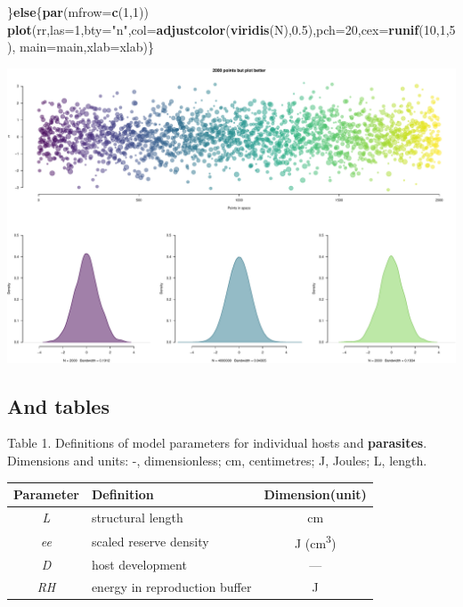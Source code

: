 \documentclass[10,portrait]{article}
\newenvironment{Shaded}{\begin{snugshade}}{\end{snugshade}}
\newcommand{\KeywordTok}[1]{\textcolor[rgb]{0.13,0.29,0.53}{\textbf{#1}}}
\newcommand{\DataTypeTok}[1]{\textcolor[rgb]{0.13,0.29,0.53}{#1}}
\newcommand{\DecValTok}[1]{\textcolor[rgb]{0.00,0.00,0.81}{#1}}
\newcommand{\FloatTok}[1]{\textcolor[rgb]{0.00,0.00,0.81}{#1}}
\newcommand{\StringTok}[1]{\textcolor[rgb]{0.31,0.60,0.02}{#1}}
\newcommand{\ControlFlowTok}[1]{\textcolor[rgb]{0.13,0.29,0.53}{\textbf{#1}}}
\newcommand{\NormalTok}[1]{#1}
\begin{document}
\begin{Shaded}
\begin{Highlighting}[]
\NormalTok{\}}\ControlFlowTok{else}\NormalTok{\{}\KeywordTok{par}\NormalTok{(}\DataTypeTok{mfrow=}\KeywordTok{c}\NormalTok{(}\DecValTok{1}\NormalTok{,}\DecValTok{1}\NormalTok{))}
  \KeywordTok{plot}\NormalTok{(rr,}\DataTypeTok{las=}\DecValTok{1}\NormalTok{,}\DataTypeTok{bty=}\StringTok{"n"}\NormalTok{,}\DataTypeTok{col=}\KeywordTok{adjustcolor}\NormalTok{(}\KeywordTok{viridis}\NormalTok{(N),}\FloatTok{0.5}\NormalTok{),}\DataTypeTok{pch=}\DecValTok{20}\NormalTok{,}\DataTypeTok{cex=}\KeywordTok{runif}\NormalTok{(}\DecValTok{10}\NormalTok{,}\DecValTok{1}\NormalTok{,}\DecValTok{5}\NormalTok{),}
       \DataTypeTok{main=}\NormalTok{main,}\DataTypeTok{xlab=}\NormalTok{xlab)\}}
\end{Highlighting}
\end{Shaded}

\includegraphics{R_is_dope_files/figure-latex/unnamed-chunk-4-1.pdf}

\newpage  

\subsection{And tables}\label{and-tables}

Table 1. Definitions of model parameters for individual hosts and
\textbf{parasites}. Dimensions and units: -, dimensionless; cm,
centimetres; J, Joules; L, length.

\begin{longtable}[]{@{}clc@{}}
\toprule
Parameter & Definition & Dimension(unit)\tabularnewline
\midrule
\endhead
\emph{L} & structural length & cm\tabularnewline
\emph{ee} & scaled reserve density & J
(cm\textsuperscript{3})\tabularnewline
\emph{D} & host development & ---\tabularnewline
\emph{RH} & energy in reproduction buffer & J\tabularnewline
\bottomrule
\end{longtable}
\end{document}
